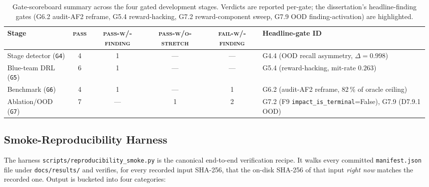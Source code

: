 \begin{table}[!htbp]
\centering
\caption{Gate-scoreboard summary across the four gated development stages. Verdicts are reported per-gate; the dissertation's headline-finding gates (G6.2 audit-AF2 reframe, G5.4 reward-hacking, G7.2 reward-component sweep, G7.9 OOD finding-activation) are highlighted.}
\label{tab:scoreboard_summary}
\begin{tabular}{l c c c c l}
\hline
Stage & \textsc{pass} & \textsc{pass-w/-finding} & \textsc{pass-w/o-stretch} & \textsc{fail-w/-finding} & Headline-gate ID \\
\hline
Stage detector (\texttt{G4}) & 4 & 1 & --- & --- & G4.4 (OOD recall asymmetry, $\Delta = 0.998$) \\
Blue-team DRL (\texttt{G5}) & 6 & 1 & --- & --- & G5.4 (reward-hacking, mit-rate $0.263$) \\
Benchmark (\texttt{G6}) & 4 & 1 & --- & 1 & G6.2 (audit-AF2 reframe, 82\,\% of oracle ceiling) \\
Ablation/OOD (\texttt{G7}) & 7 & --- & 1 & 2 & G7.2 (F9 \texttt{impact\_is\_terminal}=False), G7.9 (D7.9.1 OOD) \\
\hline
\end{tabular}
\end{table}

\subsection{Smoke-Reproducibility Harness}\label{app:r1}
The harness \texttt{scripts/reproducibility\_smoke.py} is the canonical end-to-end verification recipe. It walks every committed \texttt{manifest.json} file under \texttt{docs/results/} and verifies, for every recorded input SHA-256, that the on-disk SHA-256 of that input \emph{right now} matches the recorded one. Output is bucketed into four categories:

